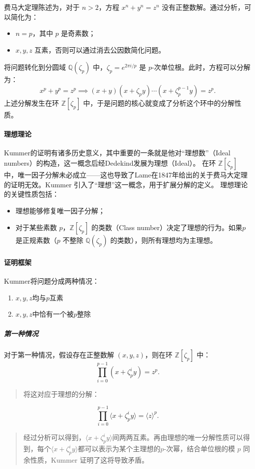 \documentclass{article}
\newcommand{\upcite}[1]{\textsuperscript{\textsuperscript{\cite{#1}}}}
\begin{document}
\noindent
费马大定理陈述为，对于 $n > 2$，方程 $x^n + y^n = z^n$ 没有正整数解。通过分析，可以简化为：
\begin{itemize}
    \item $n=p$，其中 $p$ 是奇素数；
    \item $x,y,z$ 互素，否则可以通过消去公因数简化问题。
\end{itemize}

\noindent
将问题转化到分圆域 $\mathbb{Q}(\zeta_p)$ 中，$\zeta_p = e^{2\pi i / p}$ 是 $p$-次单位根。此时，方程可以分解为：
$$
x^p + y^p = z^p \implies (x+y)(x+\zeta_p y)\cdots(x+\zeta_p^{p-1}y) = z^p.
$$
上述分解发生在环 $\mathbb{Z}[\zeta_p]$ 中，于是问题的核心就变成了分析这个环中的分解性质。

\paragraph{理想理论}
Kummer的证明有诸多历史意义，其中重要的一条就是他对“理想数”（Ideal numbers）的构造，这一概念后经Dedekind发展为理想（Ideal）。
在环 $\mathbb{Z}[\zeta_p]$ 中，唯一因子分解未必成立——这也导致了Lame在1847年给出的关于费马大定理的证明无效。Kummer 引入了“理想”这一概念，用于扩展分解的定义。
理想理论的关键性质包括\upcite{ref1}\upcite{ref2}\upcite{ref3}：
\begin{itemize}
    \item 理想能够修复唯一因子分解；
    \item 对于某些素数 $p$，$\mathbb{Z}[\zeta_p]$ 的类数（Class number）决定了理想的行为。如果$p$是正规素数（$p$ 不整除 $\mathbb{Q}(\zeta_p)$ 的类数），则所有理想均为主理想。
\end{itemize}

\paragraph{证明框架}
Kummer将问题分成两种情况\upcite{ref2}\upcite{ref3}\upcite{ref9}：
\begin{enumerate}
\item $x,y,z$均与$p$互素
\item $x,y,z$中恰有一个被$p$整除
\end{enumerate}
\subparagraph{第一种情况}
对于第一种情况，假设存在正整数解 $(x,y,z)$，则在环 $\mathbb{Z}[\zeta_p]$ 中：
$$
\prod_{i=0}^{p-1}(x+\zeta_p^iy) = z^p.
$$
\begin{quote}
将这对应于理想的分解：
\end{quote}
$$
\prod_{i=0}^{p-1}\langle x+\zeta_p^iy\rangle = \langle z\rangle^p.
$$
\begin{quote}
经过分析可以得到，$\langle x+\zeta_p^iy\rangle$间两两互素。再由理想的唯一分解性质可以得到，每个$\langle x+\zeta_p^iy\rangle$都可以表示为某个主理想的$p$-次幂，结合单位根的模 $p$ 同余性质，Kummer 证明了这将导致矛盾。
\end{quote}
\end{document}
